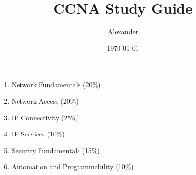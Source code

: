 \documentclass{article}
\title{CCNA Study Guide}
\author{Alexander}
\date{\today}
\begin{document}
\maketitle

\begin{enumerate}
  \item Network Fundamentals (20\%)
  \item Network Access (20\%)
  \item IP Connectivity (25\%)
  \item IP Services (10\%)
  \item Security Fundamentals (15\%)
  \item Automation and Programmability (10\%)\\
\end{enumerate}
\end{document}
